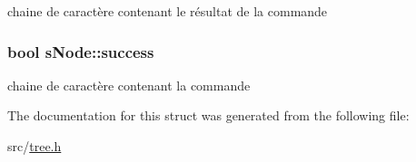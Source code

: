 chaine de caractère contenant le résultat de la commande \hypertarget{structsNode_ad3ce64c185ce2fb0da1625cc6bce9803}{
\subsubsection[{success}]{\setlength{\rightskip}{0pt plus 5cm}bool s\-Node\-::success}}\label{structsNode_ad3ce64c185ce2fb0da1625cc6bce9803}
chaine de caractère contenant la commande 

The documentation for this struct was generated from the following file\-:\begin{DoxyCompactItemize}
\item 
src/\hyperlink{tree_8h}{tree.\-h}\end{DoxyCompactItemize}
